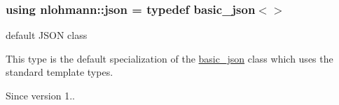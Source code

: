\subsubsection[{\texorpdfstring{json}{json}}]{\setlength{\rightskip}{0pt plus 5cm}using {\bf nlohmann\+::json} = typedef {\bf basic\+\_\+json}$<$$>$}\hypertarget{a00434_a2bfd99e845a2e5cd90aeaf1b1431f474}{}\label{a00434_a2bfd99e845a2e5cd90aeaf1b1431f474}


default J\+S\+ON class 

This type is the default specialization of the \hyperlink{a00025}{basic\+\_\+json} class which uses the standard template types.

\begin{DoxySince}{Since}
version 1.. 
\end{DoxySince}
